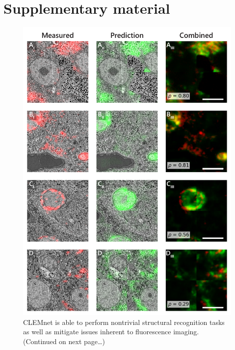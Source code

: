 \clearpage
\section{Supplementary material}
\label{sec:4_supplement}
\renewcommand{\thefigure}{S\arabic{figure}}
\setcounter{figure}{0}    

\begin{figure}[!tbh]
    \centering
    \includegraphics[width=0.95\linewidth]{chapter-4/figures_PDF/fig4-S1_rois.pdf}
    \caption{CLEMnet is able to perform nontrivial structural recognition tasks as well as mitigate issues inherent to fluorescence imaging. (Continued on next page\ldots)}
    \label{fig:4.S1_rois}
\end{figure}
\addtocounter{figure}{-1}
